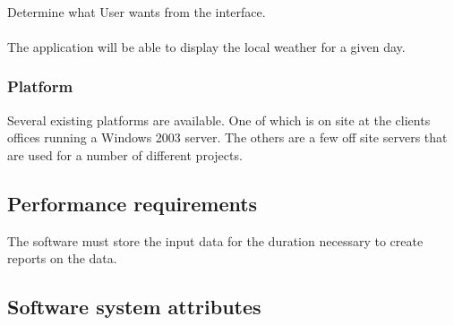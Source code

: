 \documentclass[12pt]{article}
\begin{document}
\paragraph{} Determine what User wants from the interface.
\paragraph{} The application will be able to display the local weather for a given day.

\subsubsection{Platform}\label{sec:Platform}
Several existing platforms are available. One of which is on site at the clients offices running a Windows 2003 server. The others are a few off site servers that are used for a number of different projects.

\subsection{Performance requirements}
The software must store the input data for the duration necessary to create reports on the data.

\subsection{Software system attributes}
\end{document}
